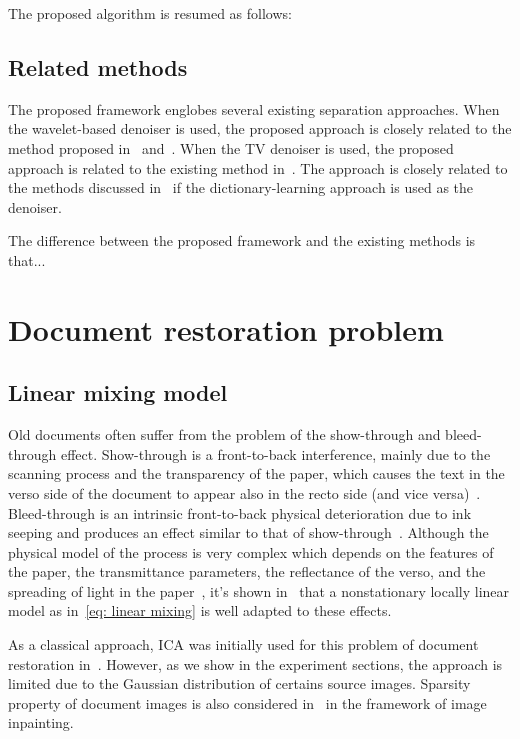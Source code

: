 \documentclass[conference]{IEEEtran}
\theoremstyle{plain}
\begin{document}
The proposed algorithm is resumed as follows:

\subsection{Related methods}
The proposed framework englobes several existing separation approaches. When the wavelet-based denoiser is used, the proposed approach is closely related to the method proposed in~\cite{ichir2003wavelet} and~\cite{kutyniok2010image}. When the TV denoiser is used, the proposed approach is related to the existing method in~\cite{souidene2007blind}. The approach is closely related to the methods discussed in~\cite{zhao2014blind} if the dictionary-learning approach is used as the denoiser.

The difference between the proposed framework and the existing methods is that...


\section{Document restoration problem}
\label{sec: document restoration}

\subsection{Linear mixing model}
Old documents often suffer from the problem of the show-through and bleed-through effect. Show-through is a front-to-back interference, mainly due to the scanning process and the transparency of the paper, which
causes the text in the verso side of the document to appear also in the recto side (and vice versa)~\cite{sharma2001show}. Bleed-through is an intrinsic front-to-back physical deterioration due to ink seeping and produces an effect similar to that of show-through~\cite{boccuto2019blind}. Although the physical model of the process is very complex which depends on the features of the paper, the transmittance parameters, the reflectance of the verso, and the spreading of light in the paper~\cite{tonazzini2015non,martinelli2012nonlinear,moghaddam2009low,almeida2008wavelet}, it's shown in~\cite{boccuto2019blind} that a nonstationary locally linear model as in~\eqref{eq: linear mixing} is well adapted to these effects.

As a classical approach, ICA was initially used for this problem of document restoration in~\cite{tonazzini2004independent}. However, as we show in the experiment sections, the approach is limited due to the Gaussian distribution of certains source images. Sparsity property of document images is also considered in~\cite{hanif2018non} in the framework of image inpainting. 
\end{document}
